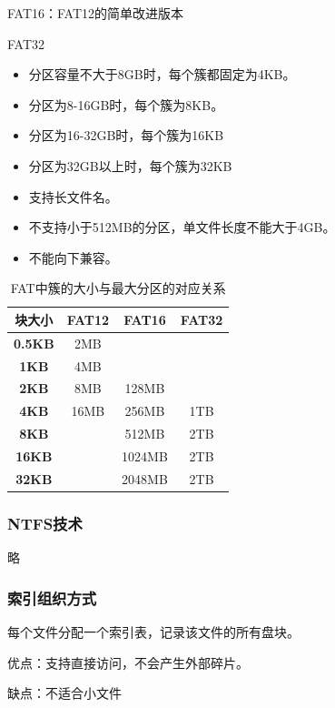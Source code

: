 \documentclass[12pt, a4paper, oneside]{ctexart}
\begin{document}
FAT16：FAT12的简单改进版本

FAT32
\begin{itemize}
    \item 分区容量不大于8GB时，每个簇都固定为4KB。
    \item 分区为8-16GB时，每个簇为8KB。
    \item 分区为16-32GB时，每个簇为16KB
    \item 分区为32GB以上时，每个簇为32KB
    \item 支持长文件名。
    \item 不支持小于512MB的分区，单文件长度不能大于4GB。
    \item 不能向下兼容。
\end{itemize}

\begin{table}[!ht]
    \centering
    \begin{tabular}{|c|c|c|c|}
    \hline
        \textbf{块大小} & \textbf{FAT12} & \textbf{FAT16} & \textbf{FAT32} \\ \hline
        \textbf{0.5KB} & 2MB & ~ & ~ \\ \hline
        \textbf{1KB} & 4MB & ~ & ~ \\ \hline
        \textbf{2KB} & 8MB & 128MB & ~ \\ \hline
        \textbf{4KB} & 16MB & 256MB & 1TB \\ \hline
        \textbf{8KB} & ~ & 512MB & 2TB \\ \hline
        \textbf{16KB} & ~ & 1024MB & 2TB \\ \hline
        \textbf{32KB} & ~ & 2048MB & 2TB \\ \hline
    \end{tabular}
    \caption{FAT中簇的大小与最大分区的对应关系}
\end{table}

\subsubsection{NTFS技术}

略

\subsubsection{索引组织方式}

每个文件分配一个索引表，记录该文件的所有盘块。

优点：支持直接访问，不会产生外部碎片。

缺点：不适合小文件
\end{document}
